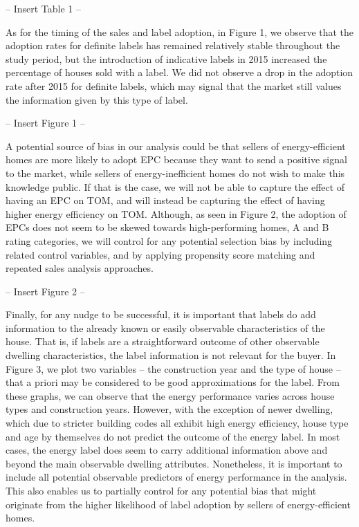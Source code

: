 \documentclass[12pt]{article}
\begin{document}
\begin{center}
-- Insert Table 1 --
\end{center}

As for the timing of the sales and label adoption, in Figure 1, we observe that the adoption rates for definite labels has remained relatively stable throughout the study period, but the introduction of indicative labels in 2015 increased the percentage of houses sold with a label. We did not observe a drop in the adoption rate after 2015 for definite labels, which may signal that the market still values the information given by this type of label.

\begin{center}
-- Insert Figure 1 --
\end{center}

A potential source of bias in our analysis could be that sellers of energy-efficient homes are more likely to adopt EPC because they want to send a positive signal to the market, while sellers of energy-inefficient homes do not wish to make this knowledge public. If that is the case, we will not be able to capture the effect of having an EPC on TOM, and will instead be capturing the effect of having higher energy efficiency on TOM. Although, as seen in Figure 2, the adoption of EPCs does not seem to be skewed towards high-performing homes, A and B rating categories, we will control for any potential selection bias by including related control variables, and by applying propensity score matching and repeated sales analysis approaches.

\begin{center}
-- Insert Figure 2 --
\end{center}

Finally, for any nudge to be successful, it is important that labels do add information to the already known or easily observable characteristics of the house. That is, if labels are a straightforward outcome of other observable dwelling characteristics, the label information is not relevant for the buyer. In Figure 3, we plot two variables – the construction year and the type of house – that a priori may be considered to be good approximations for the label. From these graphs, we can observe that the energy performance varies across house types and construction years. However, with the exception of newer dwelling, which due to stricter building codes all exhibit high energy efficiency, house type and age by themselves do not predict the outcome of the energy label. In most cases, the energy label does seem to carry additional information above and beyond the main observable dwelling attributes. Nonetheless, it is important to include all potential observable predictors of energy performance in the analysis. This also enables us to partially control for any potential bias that might originate from the higher likelihood of label adoption by sellers of energy-efficient homes.
\end{document}
